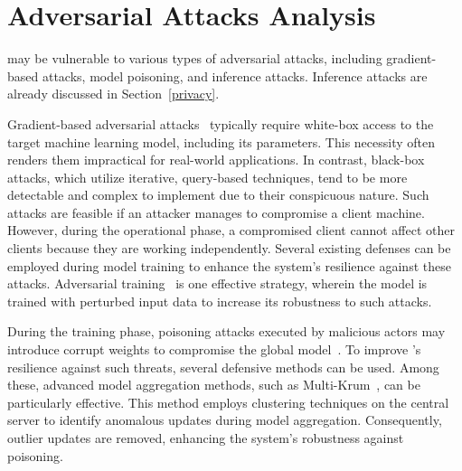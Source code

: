 \section{Adversarial Attacks Analysis}
\label{sec:adversarial}


\Sys may be vulnerable to various types of adversarial attacks, including gradient-based attacks, model poisoning, and inference attacks. Inference attacks are already discussed in Section~\ref{privacy}.

 Gradient-based adversarial attacks~\cite{chakraborty2021survey} typically require white-box access to the target machine learning model, including its parameters. This necessity often renders them impractical for real-world applications. In contrast, black-box attacks, which utilize iterative, query-based techniques, tend to be more detectable and complex to implement due to their conspicuous nature. Such attacks are feasible if an attacker manages to compromise a client machine. However, during the operational phase, a compromised client cannot affect other clients because they are working independently. Several existing defenses can be employed during model training to enhance the system's resilience against these attacks. Adversarial training~\cite{tramer2019adversarial} is one effective strategy, wherein the model is trained with perturbed input data to increase its robustness to such attacks.

 During the training phase, poisoning attacks executed by malicious actors may introduce corrupt weights to compromise the global model~\cite{jagielski2018manipulating}. To improve \Sys's resilience against such threats, several defensive methods can be used. Among these, advanced model aggregation methods, such as Multi-Krum~\cite{munoz2019byzantine}, can be particularly effective. This method employs clustering techniques on the central server to identify anomalous updates during model aggregation. Consequently, outlier updates are removed, enhancing the system's robustness against poisoning.
